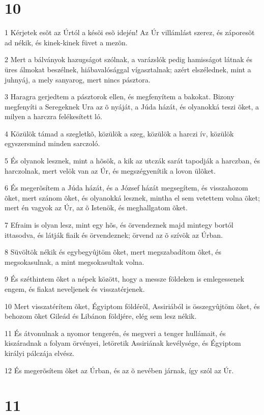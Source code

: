 \chapter{10}

\par 1 Kérjetek esõt az Úrtól a késõi esõ idején! Az Úr villámlást szerez, és záporesõt ad nékik, és kinek-kinek füvet a mezõn.
\par 2 Mert a bálványok hazugságot szólnak, a varázslók pedig hamisságot látnak és üres álmokat beszélnek, hiábavalósággal vígasztalnak; azért elszélednek, mint a juhnyáj, a mely sanyarog, mert nincs pásztora.
\par 3 Haragra gerjedtem a pásztorok ellen, és megfenyítem a bakokat. Bizony megfenyíti a Seregeknek Ura az õ nyáját, a Júda házát, és olyanokká teszi õket, a milyen a harczra felékesített ló.
\par 4 Közülök támad a szegletkõ, közülök a szeg, közülök a harczi ív, közülök egyszersmind minden sarczoló.
\par 5 És olyanok lesznek, mint a hõsök, a kik az utczák sarát tapodják a harczban, és harczolnak, mert velök van az Úr, és megszégyenítik a lovon ülõket.
\par 6 És megerõsítem a Júda házát, és a József házát megsegítem, és visszahozom õket, mert szánom õket, és olyanokká lesznek, mintha el sem vetettem volna õket; mert én vagyok az Úr, az õ Istenök, és meghallgatom õket.
\par 7 Efraim is olyan lesz, mint egy hõs, és örvendeznek majd mintegy bortól ittasodva, és látják fiaik és örvendeznek; örvend az õ szívök az Úrban.
\par 8 Süvöltök nékik és egybegyûjtöm õket, mert megszabadítom õket, és megsokasulnak, a mint megsokasultak volna.
\par 9 És széthintem õket a népek között, hogy a messze földeken is emlegessenek engem, és fiakat neveljenek és visszatérjenek.
\par 10 Mert visszatérítem õket, Égyiptom földérõl, Assiriából is összegyûjtöm õket, és behozom õket Gileád és Libánon földjére, elég sem lesz nékik.
\par 11 És átvonulnak a nyomor tengerén, és megveri a tenger hullámait, és kiszáradnak a folyam örvényei, letöretik Assiriának kevélysége, és Égyiptom királyi pálczája elvész.
\par 12 És megerõsítem õket az Úrban, és az õ nevében járnak, így szól az Úr.

\chapter{11}

